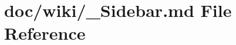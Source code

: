 \hypertarget{___sidebar_8md}{}\section{doc/wiki/\+\_\+\+Sidebar.md File Reference}
\label{___sidebar_8md}
